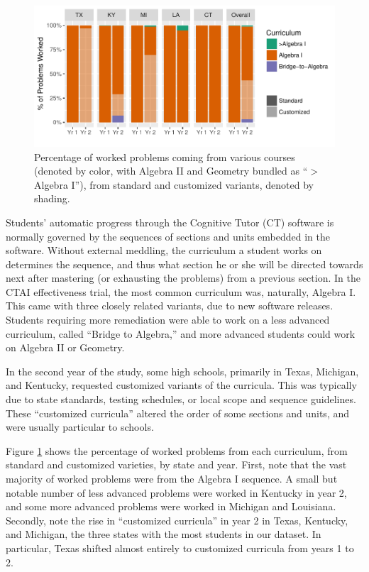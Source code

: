 \documentclass[12pt]{article}\usepackage[]{graphicx}\usepackage[]{color}
\makeatletter
\def\maxwidth{ %
  \ifdim\Gin@nat@width>\linewidth
    \linewidth
  \else
    \Gin@nat@width
  \fi
}
\makeatother
\begin{document}
\begin{figure}
  \centering

\includegraphics[width=\maxwidth]{figure/curricula-1} 

\caption{Percentage of worked problems coming from various courses
  (denoted by color, with Algebra II and Geometry bundled as ``$>$Algebra I''), from
  standard and customized variants, denoted by shading.}
\label{fig:curricula}
\end{figure}

Students' automatic progress through the Cognitive Tutor (CT) software
is normally governed by
the sequences of sections and units embedded in the software.
Without external meddling, the curriculum a student works on
determines the sequence, and thus what section he or she will be directed towards next after
mastering (or exhausting the problems) from a previous section.
In the CTAI effectiveness trial, the most common curriculum was,
naturally, Algebra I.
This came with three closely related variants, due to new software releases.
Students requiring more remediation were able to work on a less
advanced curriculum, called ``Bridge to Algebra,'' and more advanced
students could work on Algebra II or Geometry.

In the second year of the study, some high schools, primarily in
Texas, Michigan, and Kentucky, requested customized variants of the
curricula.
This was typically due to state standards, testing schedules, or local
scope and sequence guidelines.
These ``customized curricula'' altered the order of some sections and
units, and were usually particular to schools.

Figure \ref{fig:curricula} shows the percentage of worked problems
from each curriculum, from standard and customized varieties, by state
and year.
First, note that the vast majority of worked problems were from the
Algebra I sequence.
A small but notable number of less advanced problems were worked in
Kentucky in year 2, and some more advanced problems were worked in
Michigan and Louisiana.
Secondly, note the rise in ``customized curricula'' in year 2 in
Texas, Kentucky, and Michigan, the three states with the most students
in our dataset.
In particular, Texas shifted almost entirely to customized curricula
from years 1 to 2.
\end{document}

